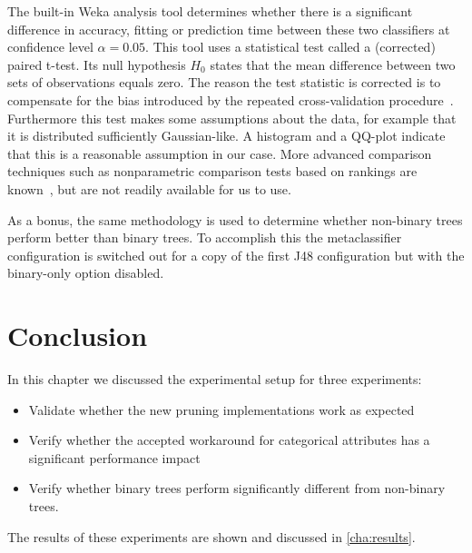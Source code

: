 The built-in Weka analysis tool determines whether there is a significant difference in accuracy, fitting or prediction time between these two classifiers at confidence level $\alpha = 0.05$. This tool uses a statistical test called a (corrected) paired t-test. Its null hypothesis $H_0$ states that the mean difference between two sets of observations equals zero. The reason the test statistic is corrected is to compensate for the bias introduced by the repeated cross-validation procedure~\cite{statcomparison-learning}. Furthermore this test makes some assumptions about the data, for example that it is distributed sufficiently Gaussian-like. A histogram and a QQ-plot indicate that this is a reasonable assumption in our case. More advanced comparison techniques such as nonparametric comparison tests based on rankings are known~\cite{statcomparison}, but are not readily available for us to use.

As a bonus, the same methodology is used to determine whether non-binary trees perform better than binary trees. To accomplish this the metaclassifier configuration is switched out for a copy of the first J48 configuration but with the binary-only option disabled.


\section{Conclusion}
In this chapter we discussed the experimental setup for three experiments:
\begin{itemize}
    \item Validate whether the new pruning implementations work as expected
    \item Verify whether the accepted workaround for categorical attributes has a significant performance impact
    \item Verify whether binary trees perform significantly different from non-binary trees.
\end{itemize}

The results of these experiments are shown and discussed in \autoref{cha:results}.
